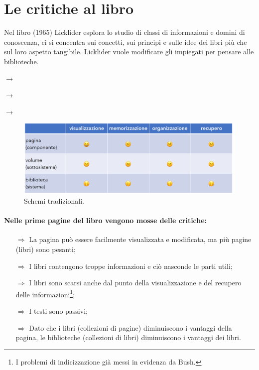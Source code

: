
\section{Le critiche al libro}

Nel libro  (1965) Licklider esplora
lo studio di classi di informazioni e domini di conoscenza, ci si concentra sui
concetti, sui principi e sulle idee dei libri più che sul loro aspetto tangibile.
Licklider vuole modificare gli  impiegati per pensare alle biblioteche.

\begin{center}
     $\rightarrow$ 

     $\rightarrow$ 

     $\rightarrow$ 
\end{center}

\begin{figure}[h]
    \centering
    \includegraphics[scale=0.35]{images/Schemi.png}
    \caption{Schemi tradizionali.}
\end{figure}

\paragraph{Nelle prime pagine del libro vengono mosse delle critiche:}

\begin{itemize}
    \item [$\Rightarrow$] La pagina può essere facilmente visualizzata e modificata, ma più pagine (libri) sono pesanti;
    \item [$\Rightarrow$] I libri contengono troppe informazioni e ciò nasconde le parti utili;
    \item [$\Rightarrow$] I libri sono scarsi anche dal punto della visualizzazione e del recupero delle informazioni\footnote{I problemi di indicizzazione già messi in evidenza da Bush.};
    \item [$\Rightarrow$] I testi sono passivi;
    \item [$\Rightarrow$] Dato che i libri (collezioni di pagine) diminuiscono i vantaggi della pagina, le biblioteche (collezioni di libri) diminuiscono i vantaggi dei libri.
\end{itemize}

